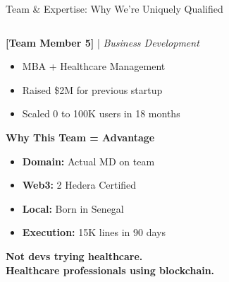 \documentclass[aspectratio=169,xcolor=dvipsnames,20pt]{beamer}
\newcommand{\checkitem}{\item[\color{SuccessGreen}\faCheckCircle]}
\begin{document}
\begin{frame}{Team \& Expertise: Why We're Uniquely Qualified}
\begin{columns}[T]
\begin{column}{0.5\textwidth}
      \vspace{0.2cm}

      \textbf{[Team Member 5]} | \textit{Business Development}
      \begin{itemize}
        \item MBA + Healthcare Management
        \item Raised \$2M for previous startup
        \item Scaled 0 to 100K users in 18 months
      \end{itemize}

      \vspace{0.3cm}

      \textbf{\textcolor{HederaPurple}{Why This Team = Advantage}}

      \begin{itemize}
        \checkitem \textbf{Domain:} Actual MD on team
        \checkitem \textbf{Web3:} 2 Hedera Certified
        \checkitem \textbf{Local:} Born in Senegal
        \checkitem \textbf{Execution:} 15K lines in 90 days
      \end{itemize}

      \vspace{0.2cm}

      \begin{center}
        \textbf{Not devs trying healthcare.} \\
        \textbf{Healthcare professionals using blockchain.}
      \end{center}
    \end{column}
  \end{columns}

\end{frame}
\end{document}
